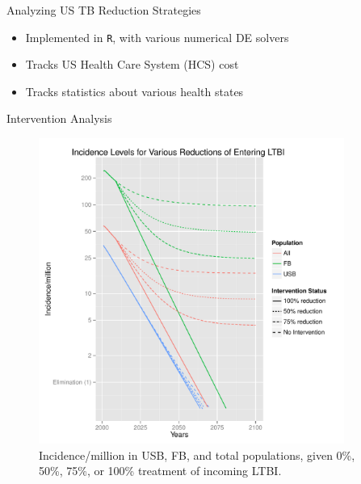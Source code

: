 \documentclass[final]{beamer}
\begin{document}
\begin{frame}
\begin{columns}
    \begin{column}{.3\textwidth}
      \vspace{-1.5em}
      \begin{block}{Analyzing US TB Reduction Strategies}
        \begin{itemize}
          \item Implemented in \texttt{R}, with various numerical DE solvers
          \item Tracks US Health Care System (HCS) cost
          \item Tracks statistics about various health states
        \end{itemize}
      \end{block}
      \begin{block}{Intervention Analysis}
        \vspace{-1.6em}
        \begin{figure}[h]
          \begin{center}
            \includegraphics[height=10cm,width=\textwidth]{incidencePlotRedEnLTBI}
          \end{center}
          \caption{Incidence/million in USB, FB, and total populations,
                   given 0\%, 50\%, 75\%, or 100\% treatment of incoming
                   LTBI.}
          \label{fig:redEnLTBI_incidence}
        \end{figure}
        \begin{figure}[h]
          \begin{center}

\end{center}
\end{figure}
\end{block}
\end{column}
\end{columns}
\end{frame}
\end{document}
